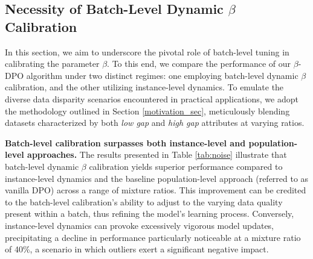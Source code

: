 \subsection{Necessity of Batch-Level Dynamic $\beta$ Calibration}
\label{sec_batch_level}
In this section, we aim to underscore the pivotal role of batch-level tuning in calibrating the parameter $\beta$. To this end, we compare the performance of our $\beta$-DPO algorithm under two distinct regimes: one employing batch-level dynamic $\beta$ calibration, and the other utilizing instance-level dynamics. To emulate the diverse data disparity scenarios encountered in practical applications, we adopt the methodology outlined in Section \ref{motivation_sec}, meticulously blending datasets characterized by both \emph{low gap} and \emph{high gap} attributes at varying ratios.

\textbf{Batch-level calibration surpasses both instance-level and population-level approaches.} The results presented in Table \ref{tab:noise} illustrate that batch-level dynamic $\beta$ calibration yields superior performance compared to instance-level dynamics and the baseline population-level approach (referred to as vanilla DPO) across a range of mixture ratios. This improvement can be credited to the batch-level calibration's ability to adjust to the varying data quality present within a batch, thus refining the model's learning process.
Conversely, instance-level dynamics can provoke excessively vigorous model updates, precipitating a decline in performance particularly noticeable at a mixture ratio of 40\%, a scenario in which outliers exert a significant negative impact.


